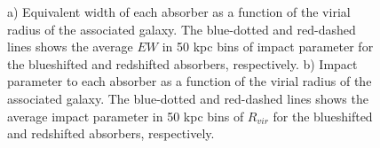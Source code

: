 \documentclass[iop]{emulateapj-rtx4}
\begin{document}
\begin{figure}[ht]
\centering
{}
\caption{\small{a) Equivalent width of each absorber as a function of the virial radius of the associated galaxy. The blue-dotted and red-dashed lines shows the average $EW$ in 50 kpc bins of impact parameter for the blueshifted and redshifted absorbers, respectively. b) Impact parameter to each absorber as a function of the virial radius of the associated galaxy. The blue-dotted and red-dashed lines shows the average impact parameter in 50 kpc bins of $R_{vir}$ for the blueshifted and redshifted absorbers, respectively.}}
\vspace{5pt}
\end{figure}




%
\end{document}
